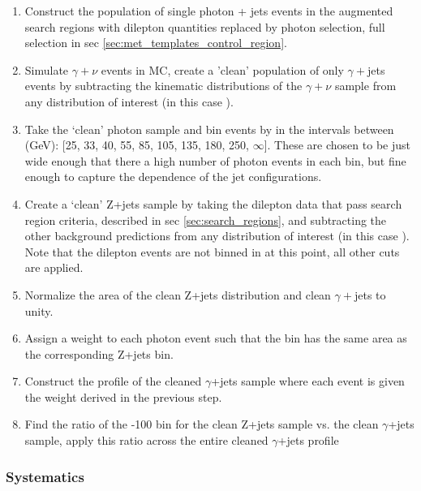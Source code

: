       \begin{enumerate}
        \item Construct the population of single photon + jets events in the augmented search regions with dilepton quantities replaced by photon selection, full selection in sec \ref{sec:met_templates_control_region}.

        \item Simulate $\gamma+\nu$ events in MC, create a 'clean' population of only $\gamma+$jets events by subtracting the kinematic distributions of the $\gamma+\nu$ sample from any distribution of interest (in this case \pt).

        \item Take the `clean' photon sample and bin events by \pt in the intervals between (GeV): [25, 33, 40, 55, 85, 105, 135, 180, 250, $\infty$]. These are chosen to be just wide enough that there a high number of photon events in each bin, but fine enough to capture the \pt dependence of the jet configurations. 

        \item Create a `clean' Z+jets sample by taking the dilepton data that pass search region criteria, described in sec \ref{sec:search_regions}, and subtracting the other background predictions from any distribution of interest (in this case \pt). Note that the dilepton events are not binned in \MET at this point, all other cuts are applied.

        \item Normalize the area of the clean Z+jets \pt distribution and clean $\gamma+$jets to unity.

        \item Assign a weight to each photon event such that the bin has the same area as the corresponding Z+jets \pt bin.

        \item Construct the \MET profile of the cleaned $\gamma$+jets sample where each event is given the weight derived in the previous step.

        \item Find the ratio of the -100 bin for the clean Z+jets sample vs. the clean $\gamma$+jets sample, apply this ratio across the entire cleaned $\gamma$+jets \MET profile

      \end{enumerate}

    \subsubsection{Systematics}

